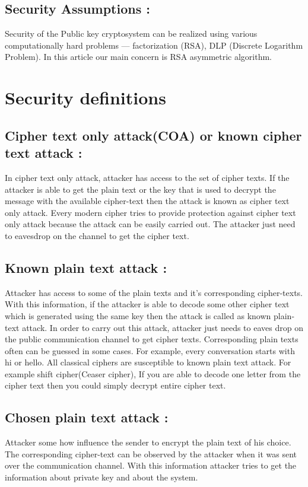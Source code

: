 \documentclass{article}
\begin{document}
	\subsection{Security Assumptions :}
	Security of the Public key cryptosystem can be realized using various computationally hard problems --- factorization (RSA), DLP (Discrete Logarithm Problem). In this article our main concern is RSA asymmetric algorithm.
	
	\section{Security definitions }
	\subsection{Cipher text only attack(COA) or known cipher text attack :}
	In cipher text only attack, attacker has access to the set of cipher texts. If the attacker is able to get the plain text or the key that is used to decrypt the message with the available cipher-text then the attack is known as cipher text only attack. Every modern cipher tries to provide protection against cipher text only attack because the attack can be easily carried out. The attacker just need to eavesdrop on the channel to get the cipher text.

	\subsection{Known plain text attack :}
	Attacker has access to some of the plain texts and it's corresponding cipher-texts. With this information, if the attacker is able to decode some other cipher text which is generated using the same key then the attack is called as known plain-text attack. In order to carry out this attack, attacker just needs to eaves drop on the public communication channel to get cipher texts. Corresponding plain texts often can be guessed in some cases. For example, every conversation starts with hi or hello. 
	All classical ciphers are susceptible to known plain text attack. For example shift cipher(Ceaser cipher), If you are able to decode one letter from the cipher text then you could simply decrypt entire cipher text. 
	\subsection{Chosen plain text attack :}
	Attacker some how influence the sender to encrypt the plain text of his choice. The corresponding cipher-text can be observed by the attacker when it was sent over the communication channel. With this information attacker tries to get the information about private key and about the system.
\end{document}
